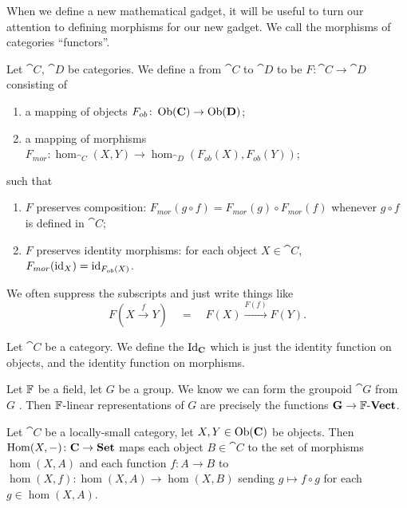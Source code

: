 \begin{node}[Functors]\label{cat-0009}%
When we define a new mathematical gadget, it will be useful to turn our
attention to defining morphisms for our new gadget. We call the
morphisms of categories ``functors''.

\begin{definition}
Let $\cat{C}$, $\cat{D}$ be categories. We define a 
from $\cat{C}$ to $\cat{D}$ to be $F\colon\cat{C}\to\cat{D}$ consisting
of
\begin{enumerate}
\item a mapping of objects $F_{ob}\colon\operatorname{Ob}(\mathbf{C})\to\operatorname{Ob}(\mathbf{D})$;
\item a mapping of morphisms $F_{mor}\colon\hom_{\cat{C}}(X,Y)\to\hom_{\cat{D}}(F_{ob}(X),F_{ob}(Y))$;
\end{enumerate}
such that
\begin{enumerate}
\item $F$ preserves composition: $F_{mor}(g\circ f)=F_{mor}(g)\circ F_{mor}(f)$ whenever
  $g\circ f$ is defined in $\cat{C}$;
\item $F$ preserves identity morphisms: for each object $X\in\cat{C}$, $F_{mor}(\operatorname{id}_{X})=\operatorname{id}_{F_{ob}(X)}$.
\end{enumerate}
We often suppress the subscripts and just write things like
\[F\left(X\xrightarrow{f}Y\right)\quad=\quad F(X)\xrightarrow{F(f)}F(Y).\]
\end{definition}

\begin{node}[Examples]\label{cat-000J}%
\begin{node}\label{cat-000L}%
Let $\cat{C}$ be a category. We define the 
$\operatorname{Id}_{\mathbf{C}}$ which is just the identity function on objects, and the
identity function on morphisms.
\end{node}
  
\begin{node}\label{cat-000K}%
Let $\mathbb{F}$ be a field, let $G$ be a group. We know we can form the
groupoid $\cat{G}$ from $G$ . Then $\mathbb{F}$-linear
representations of $G$ are precisely the functions $\mathbf{G}\to\mathbb{F}\textrm{-}\mathbf{Vect}$.
\end{node}

\begin{node}\label{cat-000N}%
Let $\cat{C}$ be a locally-small category, let $X,Y\in\operatorname{Ob}(\mathbf{C})$ be
objects. Then $\operatorname{Hom}(X,-)\colon\mathbf{C}\to\mathbf{Set}$ maps each object
$B\in\cat{C}$ to the set of morphisms $\hom(X,A)$ and each function
$f\colon A\to B$ to $\hom(X,f)\colon\hom(X,A)\to\hom(X,B)$ sending
$g\mapsto f\circ g$ for each $g\in\hom(X,A)$.


\end{node}
\end{node}
\end{node}
